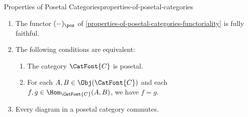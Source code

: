 \begin{proposition}{Properties of Posetal Categories}{properties-of-posetal-categories}
\begin{enumerate}
\begin{itemize}
\begin{itemize}
\[                                \defeq%
                                \pt_{\Hom_{Y_{\pos}}(f(x),f(y))}%
                            \]%
                            if $x\preceq_{X}y$ or, otherwise, by the inclusion of the empty set into $\Hom_{Y_{\pos}}(f(x),f(y))$.
                    \end{itemize}
            \end{itemize}
        \item\label{properties-of-posetal-categories-fully-faithfulness}The functor $(-)_{\pos}$ of \cref{properties-of-posetal-categories-functoriality} is fully faithful.
        \item\label{properties-of-posetal-categories-characterisations}The following conditions are equivalent:
            \begin{enumerate}
                \item\label{properties-of-posetal-categories-characterisations-a}The category $\CatFont{C}$ is posetal.
                \item\label{properties-of-posetal-categories-characterisations-b}For each $A,B\in\Obj(\CatFont{C})$ and each $f,g\in\Hom_{\CatFont{C}}(A,B)$, we have $f=g$.
            \end{enumerate}
        \item\label{properties-of-posetal-categories-automatic-commutativity-of-diagrams}Every diagram in a posetal category commutes.
    \end{enumerate}
\end{proposition}
